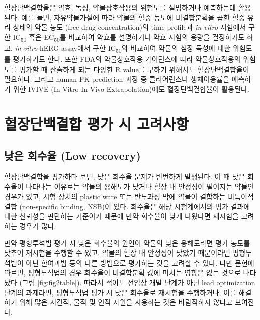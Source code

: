 \documentclass[
  11pt,
  krantz2, a4paper, twoside]{krantz}
\begin{document}
혈장단백결합율은 약효, 독성, 약물상호작용의 위험도를 설명하거나
예측하는데 활용된다. 예를 들면, 자유약물가설에 따라 약물의 혈중 농도에
비결합분획을 곱한 혈중 유리 상태의 약물 농도 (free drug concentration)의
time profile과 \emph{in vitro} 시험에서 구한 IC\textsubscript{50} 혹은 EC\textsubscript{50}를 비교하여
약효를 설명하거나 약효 시험의 용량을 결정하기도 하고, \emph{in vitro} hERG
assay에서 구한 IC\textsubscript{50}와 비교하여 약물의 심장 독성에 대한 위험도를
평가하기도 한다. 또한 FDA의 약물상호작용 가이던스에 따라 약물상호작용의
위험도를 평가할 때 산출하게 되는 다양한 R value를 구하기 위해서도
혈장단백결합율이 필요하다. 그리고 human PK prediction 과정 중
클리어런스나 생체이용률을 예측하기 위한 IVIVE (In Vitro-In Vivo
Extrapolation)에도 혈장단백결합율이 활용된다.

\hypertarget{uxd608uxc7a5uxb2e8uxbc31uxacb0uxd569-uxd3c9uxac00-uxc2dc-uxace0uxb824uxc0acuxd56d}{%
\section{혈장단백결합 평가 시 고려사항}\label{uxd608uxc7a5uxb2e8uxbc31uxacb0uxd569-uxd3c9uxac00-uxc2dc-uxace0uxb824uxc0acuxd56d}}

\hypertarget{uxb0aeuxc740-uxd68cuxc218uxc728-low-recovery}{%
\subsection{낮은 회수율 (Low recovery)}\label{uxb0aeuxc740-uxd68cuxc218uxc728-low-recovery}}

혈장단백결합을 평가하다 보면, 낮은 회수율 문제가 빈번하게 발생된다. 이
때 낮은 회수율이 나타나는 이유로는 약물의 용해도가 낮거나 혈장 내
안정성이 떨어지는 약물인 경우가 있고, 시험 장치의 plastic ware 또는
반투과성 막에 약물이 결합하는 비특이적 결합 (non-specific binding,
NSB)이 있다. 회수율은 해당 시험계에서의 평가 결과에 대한 신뢰성을
판단하는 기준이기 때문에 만약 회수율이 낮게 나왔다면 재시험을 고려하는
경우가 많다.

만약 평형투석법 평가 시 낮은 회수율의 원인이 약물의 낮은 용해도라면 평가
농도를 낮추어 재시험을 수행할 수 있고, 약물의 혈장 내 안정성이 낮았기
때문이라면 평형투석법이 아닌 한여과법 등의 다른 방법으로 평가하는 것을
고려할 수 있다. 다만 문헌에 따르면, 평형투석법의 경우 회수율이
비결합분획 값에 미치는 영향은 없는 것으로 나타났다 (그림 \ref{fig:fig2table}). 따라서
적어도 전임상 개발 단계가 아닌 lead optimization 단계의 과제라면,
평형투석법 평가 시 낮은 회수율로 재시험을 수행하거나, 이를 해결하기 위해
많은 시간적, 물적 및 인적 자원을 사용하는 것은 바람직하지 않다고
보여진다.
\end{document}
